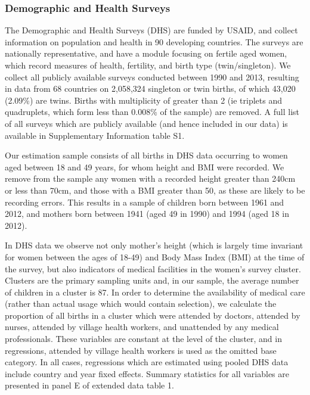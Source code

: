 \documentclass{nature}
\begin{document}
\begin{linenumbers}
\subsubsection{Demographic and Health Surveys}
The Demographic and Health Surveys (DHS) are funded by USAID, and collect information on population and health in 90 developing countries.  The surveys are nationally representative, and have a module focusing on fertile aged women, which record measures of health, fertility, and birth type (twin/singleton).  We collect all publicly available surveys conducted between 1990 and 2013, resulting in data from 68 countries on 2,058,324 singleton or twin births, of which 43,020 (2.09\%) are twins.  Births with multiplicity of greater than 2 (ie triplets and quadruplets, which form less than 0.008\% of the sample) are removed.  A full list of all surveys which are publicly available (and hence included in our data) is available in Supplementary Information table S1.

Our estimation sample consists of all births in DHS data occurring to women aged between 18 and 49 years, for whom height and BMI were recorded.  We remove from the sample any women with a recorded height greater than 240cm or less than 70cm, and those with a BMI greater than 50, as these are likely to  be recording errors.  This results in a sample of children born between 1961 and 2012, and mothers born between 1941 (aged 49 in 1990) and 1994 (aged 18 in 2012).  


In DHS data we observe not only mother's height (which is largely time invariant for women between the ages of 18-49) and  Body Mass Index (BMI) at the time of the survey, but also indicators of medical facilities in the women's survey cluster. Clusters  are the primary sampling units and, in our sample, the average number of children in a cluster is 87. In order to determine the availability of medical care (rather than actual usage which would contain selection), we calculate the proportion of all births in a cluster which were attended by doctors, attended by nurses, attended by village health workers, and unattended by any medical professionals. These variables are constant at the level of the cluster, and in regressions, attended by village health workers is used as the omitted base category.  In all cases, regressions which are estimated using pooled DHS data include country and year fixed effects. Summary statistics for all variables are presented in panel E of extended data table 1.


\end{linenumbers}
\end{document}
